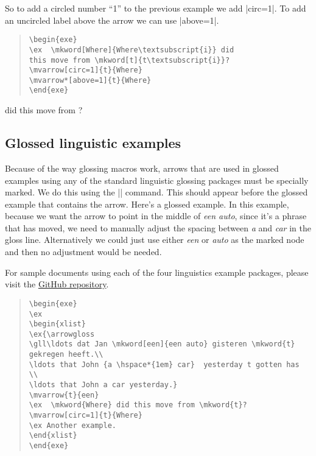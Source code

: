 \documentclass[11pt]{article}
\begin{document}
So to add a circled number “1” to the previous example we add |circ=1|. To add an uncircled label above the arrow we can use |above=1|.

\begin{quote}
\begin{lstlisting}
\begin{exe}
\ex  \mkword[Where]{Where\textsubscript{i}} did 
this move from \mkword[t]{t\textsubscript{i}}?
\mvarrow[circ=1]{t}{Where}
\mvarrow*[above=1]{t}{Where}
\end{exe}
\end{lstlisting}
\end{quote}

\begin{exe}
\arrowstrut
\ex  {} did 
this move from ?

\end{exe}

\subsection{Glossed linguistic examples}
Because of the way glossing macros work, arrows that are used in glossed examples using any of the standard linguistic glossing packages must be specially marked. We do this using the |\arrowgloss| command. This should appear before the glossed example that contains the arrow.  Here’s a glossed example. In this example, because we want the arrow to point in the middle of \emph{een auto}, since it’s a phrase that has moved, we need to manually adjust the spacing between \emph{a} and \emph{car} in the gloss line. Alternatively we could just use either \emph{een} or \emph{auto} as the marked node and then no adjustment would be needed. 

For sample documents using each of the four linguistics example packages, please visit the   \href{https://github.com/amunn/movement-arrows/}{GitHub repository}.

\begin{quote}
\begin{lstlisting}
\begin{exe}
\ex
\begin{xlist}
\ex{\arrowgloss
\gll\ldots dat Jan \mkword[een]{een auto} gisteren \mkword{t}  gekregen heeft.\\
\ldots that John {a \hspace*{1em} car}  yesterday t gotten has \\
\ldots that John a car yesterday.}
\mvarrow{t}{een}
\ex  \mkword{Where} did this move from \mkword{t}?
\mvarrow[circ=1]{t}{Where}
\ex Another example.
\end{xlist}
\end{exe}
\end{lstlisting}
\end{quote}
\end{document}
